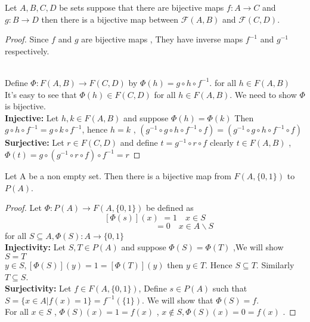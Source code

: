 \documentclass[a4paper,english,12pt]{article}   	%
\begin{document}
\begin{lem}
Let $A,B,C,D$ be sets suppose that there are bijective maps $f \colon A \to C$ and $g \colon B \to D$ then there is a bijective map between $ \mathcal{F}(A,B)$ and $ \mathcal{F}(C,D)$.
\end{lem}
\begin{proof} Since $f$ and $g$ are bijective maps , They have inverse maps $f^{-1}$ and $g^{-1}$ respectively.
\begin{figure}[hhhh]
\centering
\scalebox{.8}{}
\caption{}
\label{Fig:}
\end{figure}\\
Define $\Phi \colon F(A,B) \to F(C,D)$ by $\Phi (h)=g \circ h \circ f^{-1}$. for all $h \in F(A,B)$ \\
It's easy to see that $\Phi (h) \in F(C,D)$ for all $h \in F(A,B)$. We need to show $\Phi$ is bijective.\\
\textbf{Injective:} Let $h,k \in F(A,B)$ and suppose $\Phi (h)=\Phi (k)$ Then $g \circ h \circ f^{-1} = g \circ k \circ f^{-1}$, hence $h=k$ , $(g^{-1} \circ g \circ h \circ f^{-1} \circ f)=(g^{-1} \circ g \circ h \circ f^{-1} \circ f)$\\
\textbf{Surjective:} Let $r \in F(C,D)$ and define $t=g^{-1} \circ r \circ f$ clearly $t \in F(A,B)$ , $\Phi (t)=g \circ (g^{-1} \circ r \circ f) \circ f^{-1}=r$
\end{proof}
\begin{prop} Let A be a non empty set. Then there is a bijective map from $F(A,\{0,1\})$ to $P(A)$.
\begin{proof} Let $\Phi \colon P(A) \to F(A,\{0,1\})$ be defined as\\
\[ [\Phi (s)](x)\, \, = 1  \quad  x \in S \] 
$\qquad \qquad \qquad \qquad \qquad \qquad \qquad \qquad \qquad=0 \quad  x \in A \backslash S$\\
for all $S \subseteq A , \Phi (S) \colon A \to \{0,1\}$\\
\textbf{Injectivity:} Let $S,T \in P(A)$ and suppose $\Phi (S)=\Phi (T)$ ,We will show $S=T$\\
$y \in S , [ \Phi (S)](y)=1=[ \Phi (T)](y)$ then $y \in T$. Hence $S \subseteq T$. Similarly $T \subseteq S$.\\
\textbf{Surjectivity:} Let $f \in F(A,\{0,1\})$, Define $s \in P(A)$ such that $S=\{x \in A | f(x)=1\}=f^{-1}(\{1\})$. We will show that 
$\Phi (S)=f$.\\ For all $x \in S$ , $\Phi (S)(x)=1=f(x)$ , $x \notin S , \Phi(S)(x)=0=f(x)$ .
\end{proof}
\end{prop}
\end{document}
